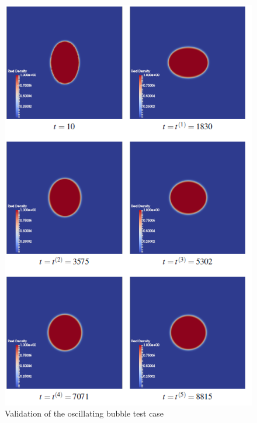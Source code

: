 \documentclass[12pt, openany]{book}
\begin{document}
    \begin{figure}[H]
       	\centering
       	\includegraphics[width=\linewidth]{Resources/Images/AntonioValid/OscillatingBubble.PNG}
       	\caption{Validation of the oscillating bubble test case}
       	\label{fig:oscilvalid}
    \end{figure}
    
\end{document}
